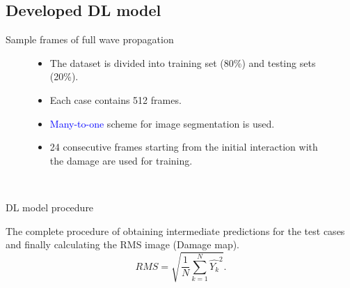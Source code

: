 \documentclass[10pt,aspectratio=169]{beamer} %
\begin{document}
\subsection{Developed DL model}
\setcounter{subfigure}{0}
\begin{frame}{Sample frames of full wave propagation}
	\begin{figure}
		\begin{minipage}[l]{0.3\textwidth}
			\normalsize
			\begin{itemize}
				\item The dataset is divided into training set (80\%) and testing sets (20\%).
				\item Each case contains 512 frames.
				\item \textcolor{blue}{Many-to-one} scheme for image segmentation is used.
				\item 24 consecutive frames starting from the initial interaction with the damage are used for training.
			\end{itemize}
		\end{minipage}
		\begin{minipage}[l]{0.65\textwidth}
			\centering	
			 \\	
			\qquad
			\qquad
		\end{minipage}
	\end{figure}
\end{frame}
\setcounter{subfigure}{0}
\begin{frame}{DL model procedure}
	\begin{minipage}[l]{0.35\textwidth}
		The complete procedure of obtaining intermediate predictions for
		the test cases and finally calculating the RMS image (Damage map). \\
		\begin{equation*}
			RMS = \sqrt{\frac{1}{N}\sum_{k=1}^{N}\hat{Y_k}^2}.	
			\label{RMS}
		\end{equation*}
	\end{minipage}
	\begin{minipage}[l]{0.6\textwidth}
		\begin{figure}
			\centering
			\qquad
		\end{figure}
	\end{minipage}	
\end{frame}
\end{document}
